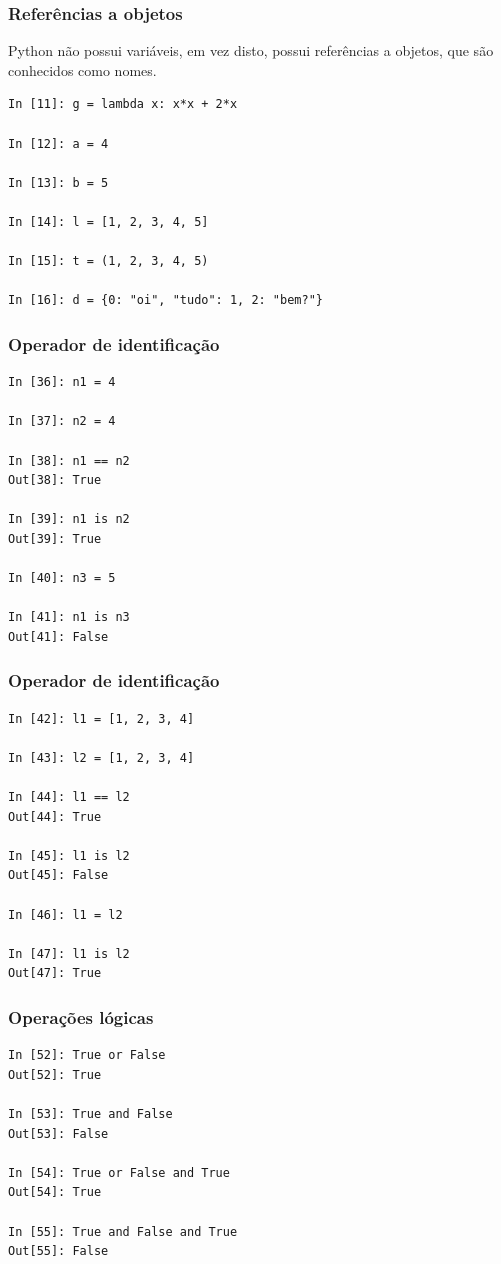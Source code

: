 \documentclass[aspectratio=169]{beamer}
\begin{document}
\begin{frame}[fragile]
	\frametitle{Referências a objetos}
	Python não possui variáveis, em vez disto, possui referências a objetos, que são
conhecidos como nomes.

	\begin{lstlisting}
In [11]: g = lambda x: x*x + 2*x

In [12]: a = 4

In [13]: b = 5

In [14]: l = [1, 2, 3, 4, 5]

In [15]: t = (1, 2, 3, 4, 5)

In [16]: d = {0: "oi", "tudo": 1, 2: "bem?"}
	\end{lstlisting}
\end{frame}

\begin{frame}[fragile]
	\frametitle{Operador de identificação}
	\begin{lstlisting}
In [36]: n1 = 4

In [37]: n2 = 4

In [38]: n1 == n2
Out[38]: True

In [39]: n1 is n2
Out[39]: True

In [40]: n3 = 5

In [41]: n1 is n3
Out[41]: False
	\end{lstlisting}
\end{frame}

\begin{frame}[fragile]
	\frametitle{Operador de identificação}
	\begin{lstlisting}
In [42]: l1 = [1, 2, 3, 4]

In [43]: l2 = [1, 2, 3, 4]

In [44]: l1 == l2
Out[44]: True

In [45]: l1 is l2
Out[45]: False

In [46]: l1 = l2

In [47]: l1 is l2
Out[47]: True
	\end{lstlisting}
\end{frame}


\begin{frame}[fragile]
	\frametitle{Operações lógicas}
	\begin{lstlisting}
In [52]: True or False
Out[52]: True

In [53]: True and False
Out[53]: False

In [54]: True or False and True
Out[54]: True

In [55]: True and False and True
Out[55]: False
	\end{lstlisting}
\end{frame}
\end{document}
